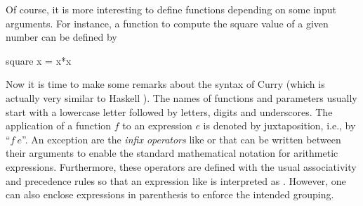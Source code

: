 Of course, it is more interesting to define functions depending
on some input arguments. For instance, a function to compute the
square value of a given number can be defined by
\begin{prog}
square x = x*x
\end{prog}
Now it is time to make some remarks about the syntax
of Curry (which is actually very similar to
Haskell \cite{PeytonJones03Haskell}).
The names of functions and parameters usually start with
a lowercase letter followed by letters, digits and underscores.
The application of a function $f$ to an expression $e$ is denoted
by juxtaposition, i.e., by ``$f~e$''. An exception are the
\emph{infix operators}%
like \code{+} or \code{*} that can be written between
their arguments to enable the standard mathematical notation
for arithmetic expressions. Furthermore, these operators
are defined with the usual associativity and precedence rules
so that an expression like  is interpreted
as . However, one can also enclose
expressions in parenthesis to enforce the intended grouping.

